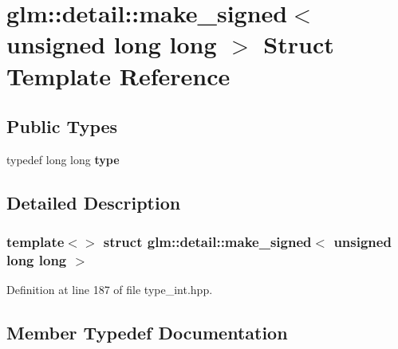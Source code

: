 \hypertarget{structglm_1_1detail_1_1make__signed_3_01unsigned_01long_01long_01_4}{}\section{glm\+:\+:detail\+:\+:make\+\_\+signed$<$ unsigned long long $>$ Struct Template Reference}
\label{structglm_1_1detail_1_1make__signed_3_01unsigned_01long_01long_01_4}
\subsection*{Public Types}
\begin{DoxyCompactItemize}
\item 
\mbox{\label{structglm_1_1detail_1_1make__signed_3_01unsigned_01long_01long_01_4_a025f1f9880bc973147ffb0371771eb0b}} 
typedef long long {\bfseries type}
\end{DoxyCompactItemize}


\subsection{Detailed Description}
\subsubsection*{template$<$$>$\newline
struct glm\+::detail\+::make\+\_\+signed$<$ unsigned long long $>$}



Definition at line 187 of file type\+\_\+int.\+hpp.



\subsection{Member Typedef Documentation}
\mbox{\label{structglm_1_1detail_1_1make__signed_3_01unsigned_01long_01long_01_4_a025f1f9880bc973147ffb0371771eb0b}} 
